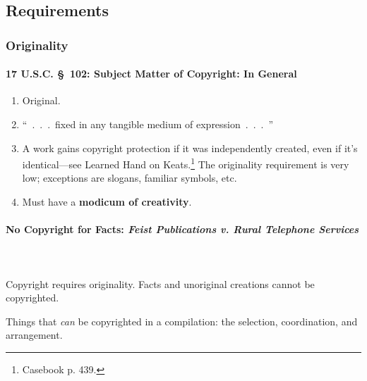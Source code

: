 \subsection{Requirements}

\subsubsection{Originality}

\paragraph{17 U.S.C. \S\ 102: Subject Matter of Copyright: In General}

\begin{enumerate}
    \item Original.
    \item ``~.~.~.~fixed in any tangible medium of expression~.~.~.~''
    \item A work gains copyright protection if it was independently created, 
    even if it's identical---see Learned Hand on Keats.\footnote{Casebook p. 
    439.} The originality requirement is very low; exceptions are slogans, 
    familiar symbols, etc.
    \item Must have a \textbf{modicum of creativity}.
\end{enumerate}

\paragraph{No Copyright for Facts: \emph{Feist Publications v. Rural Telephone 
Services}}
~\\\\
Copyright requires originality. Facts and unoriginal creations cannot be 
copyrighted.

Things that \emph{can} be copyrighted in a compilation: the selection, 
coordination, and arrangement.

